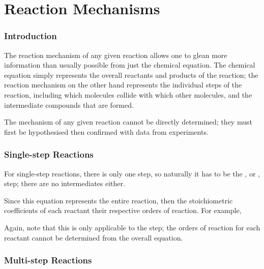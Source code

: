 

\pagebreak
\part{Reaction Mechanisms}

	\section{Introduction}

		The reaction mechanism of any given reaction allows one to glean more information than usually possible from just the chemical equation.
		The chemical equation simply represents the overall reactants and products of the reaction; the reaction mechanism on the other hand
		represents the individual steps of the reaction, including which molecules collide with which other molecules, and the intermediate
		compounds that are formed.

		The mechanism of any given reaction cannot be directly determined; they must first be hypothesised then confirmed with data from
		experiments.



	\section{Single-step Reactions}

		For single-step reactions, there is only one step, so naturally it has to be the , or , step;
		there are no intermediates either.

		Since this equation represents the entire reaction, then the stoichiometric coefficients of each reactant  their
		respective orders of reaction. For example,


		Again, note that this is only applicable to the  step; the orders of reaction for each reactant cannot be
		determined from the overall equation.




	\pagebreak
	\section{Multi-step Reactions}

